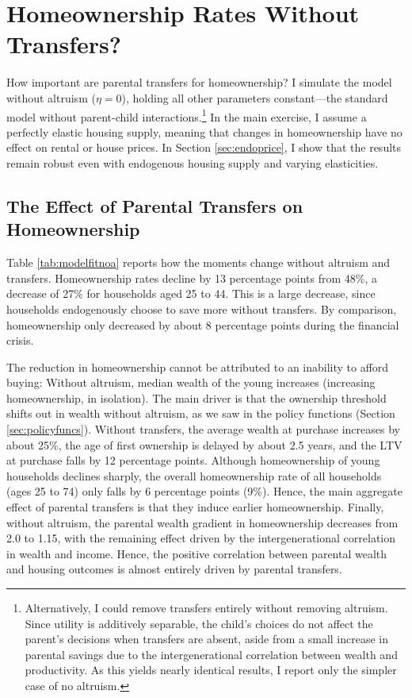 \documentclass[12pt]{article}
\begin{document}
\section{Homeownership Rates Without Transfers?}\label{sec:quant}
How important are parental transfers for homeownership? I simulate the model without altruism ($\eta=0$), holding all other parameters constant---the standard model without parent-child interactions.\footnote{Alternatively, I could remove transfers entirely without removing altruism. Since utility is additively separable, the child's choices do not affect the parent's decisions when transfers are absent, aside from a small increase in parental savings due to the intergenerational correlation between wealth and productivity. As this yields nearly identical results, I report only the simpler case of no altruism.} In the main exercise, I assume a perfectly elastic housing supply, meaning that changes in homeownership have no effect on rental or house prices. In Section \ref{sec:endoprice}, I show that the results remain robust even with endogenous housing supply and varying elasticities.

\subsection{The Effect of Parental Transfers on Homeownership}
Table \ref{tab:modelfitnoa} reports how the moments change without altruism and transfers. Homeownership rates decline by 13 percentage points from 48\%, a decrease of 27\% for households aged 25 to 44. This is a large decrease, since households endogenously choose to save more without transfers. By comparison, homeownership only decreased by about 8 percentage points during the financial crisis.

The reduction in homeownership cannot be attributed to an inability to afford buying: Without altruism, median wealth of the young increases (increasing homeownership, in isolation). The main driver is that the ownership threshold shifts out in wealth without altruism, as we saw in the policy functions (Section \ref{sec:policyfuncs}). Without transfers, the average wealth at purchase increases by about 25\%, the age of first ownership is delayed by about 2.5 years, and the LTV at purchase falls by 12 percentage points. Although homeownership of young households declines sharply, the overall homeownership rate of all households (ages 25 to 74) only falls by 6 percentage points (9\%). Hence, the main aggregate effect of parental transfers is that they induce earlier homeownership. Finally, without altruism, the parental wealth gradient in homeownership decreases from 2.0 to 1.15, with the remaining effect driven by the intergenerational correlation in wealth and income. Hence, the positive correlation between parental wealth and housing outcomes is almost entirely driven by parental transfers.
\end{document}
